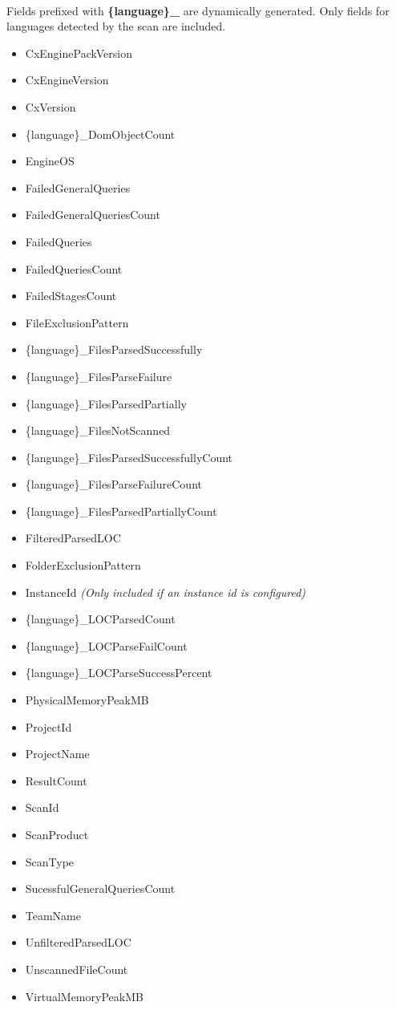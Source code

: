 \noindent\\Fields prefixed with \textbf{\{language\}\_} are dynamically generated.  Only fields for languages detected by the scan are included.

\begin{itemize}

    \item CxEnginePackVersion
    \item CxEngineVersion
    \item CxVersion
    \item \{language\}\_DomObjectCount
    \item EngineOS
    \item FailedGeneralQueries
    \item FailedGeneralQueriesCount
    \item FailedQueries
    \item FailedQueriesCount
    \item FailedStagesCount
    \item FileExclusionPattern
    \item \{language\}\_FilesParsedSuccessfully
    \item \{language\}\_FilesParseFailure
    \item \{language\}\_FilesParsedPartially
    \item \{language\}\_FilesNotScanned
    \item \{language\}\_FilesParsedSuccessfullyCount
    \item \{language\}\_FilesParseFailureCount
    \item \{language\}\_FilesParsedPartiallyCount
    \item FilteredParsedLOC
    \item FolderExclusionPattern
    \item InstanceId \textit{(Only included if an instance id is configured)}
    \item \{language\}\_LOCParsedCount
    \item \{language\}\_LOCParseFailCount
    \item \{language\}\_LOCParseSuccessPercent
    \item PhysicalMemoryPeakMB
    \item ProjectId
    \item ProjectName
    \item ResultCount
    \item ScanId
    \item ScanProduct
    \item ScanType
    \item SucessfulGeneralQueriesCount
    \item TeamName
    \item UnfilteredParsedLOC
    \item UnscannedFileCount
    \item VirtualMemoryPeakMB
\end{itemize}


